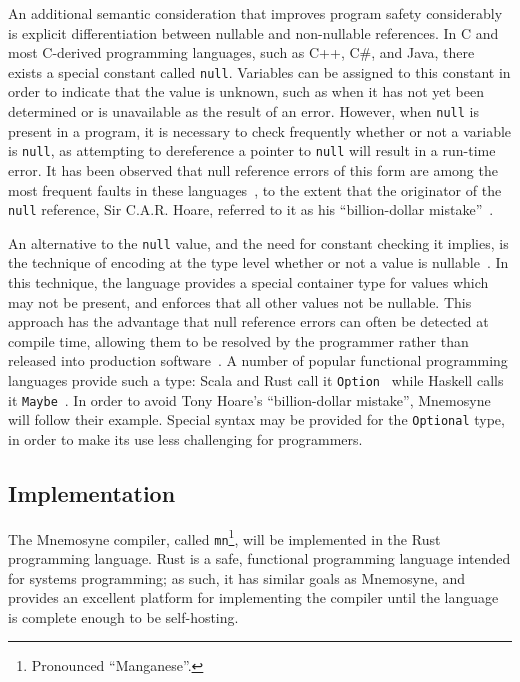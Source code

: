 \documentclass[11pt,draft]{article}
\theoremstyle{break}
\begin{document}
An additional semantic consideration that improves program safety considerably is explicit differentiation between nullable and non-nullable references. In C and most C-derived programming languages, such as C++, C\#, and Java, there exists a special constant called \texttt{null}. Variables can be assigned to this constant in order to indicate that the value is unknown, such as when it has not yet been determined or is unavailable as the result of an error. However, when \texttt{null} is present in a program, it is necessary to check frequently whether or not a variable is \texttt{null}, as attempting to dereference a pointer to \texttt{null} will result in a run-time error. It has been observed that null reference errors of this form are among the most frequent faults in these languages~\cite{Duff:2009:GNC:1541788.1541792,Chalin:2007:NRD:2394758.2394776,Fahndrich:2003:DCN:949343.949332}, to the extent that the originator of the \texttt{null} reference, Sir C.A.R. Hoare, referred to it as his ``billion-dollar mistake''~\cite{hoare2009null}.

An alternative to the \texttt{null} value, and the need for constant checking it implies, is the technique of encoding at the type level whether or not a value is nullable~\cite{Fahndrich:2003:DCN:949343.949332}. In this technique, the language provides a special container type for values which may not be present, and enforces that all other values not be nullable. This approach has the advantage that null reference errors can often be detected at compile time, allowing them to be resolved by the programmer rather than released into production software~\cite{Fahndrich:2003:DCN:949343.949332}. A number of popular functional programming languages provide such a type: Scala and Rust call it \texttt{Option}~\cite{odersky2004scala,odersky2004overview,Matsakis:2014:RL:2663171.2663188} while Haskell calls it \texttt{Maybe}~\cite{jones2003haskell,hudak1992gentle}. In order to avoid Tony Hoare's ``billion-dollar mistake'', Mnemosyne will follow their example. Special syntax may be provided for the \texttt{Optional} type, in order to make its use less challenging for programmers.

\subsection{Implementation}

The Mnemosyne compiler, called \texttt{mn}\footnote{Pronounced ``Manganese''.}, will be implemented in the Rust programming language. Rust is a safe, functional programming language intended for systems programming; as such, it has similar goals as Mnemosyne, and provides an excellent platform for implementing the compiler until the language is complete enough to be self-hosting.
\end{document}
